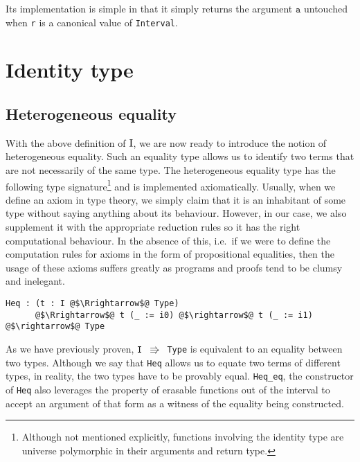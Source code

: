 \documentclass[12pt,twoside,maitrise]{dms}
\theoremstyle{definition}
\numberwithin{equation}{section}
\numberwithin{table}{chapter}
\numberwithin{figure}{chapter}
\newcommand\id[1] {\texttt{#1}}
\newcommand\fn[1] {\texttt{#1}}
\begin{document}
Its implementation is simple in that it simply returns the argument $\id{a}$
untouched when \id{r} is a canonical value of \id{Interval}.

\section{Identity type}\label{sec:identity}


\subsection{Heterogeneous equality}
With the above definition of $\mathrm{I}$, we are now ready to introduce the notion of
heterogeneous equality. Such an equality type allows us to identify two terms
that are not necessarily of the same type. The heterogeneous equality type has
the following type signature\footnote{Although not mentioned explicitly,
functions involving the identity type are universe polymorphic in their
arguments and return type.} and is implemented axiomatically. Usually, when we
define an axiom in type theory, we simply claim that it is an inhabitant of some
type without saying anything about its behaviour. However, in our case, we also
supplement it with the appropriate reduction rules so it has the right
computational behaviour. In the absence of this, i.e.\ if we were to define the
computation rules for axioms in the form of propositional equalities, then the
usage of these axioms suffers greatly as programs and proofs tend to be clumsy
and inelegant.

\begin{verbatim}
Heq : (t : I @$\Rrightarrow$@ Type)
      @$\Rrightarrow$@ t (_ := i0) @$\rightarrow$@ t (_ := i1) @$\rightarrow$@ Type
\end{verbatim}

As we have previously proven, \fn{I $\Rrightarrow$ Type} is equivalent to an
equality between two types. Although we say that \fn{Heq} allows us to equate
two terms of different types, in reality, the two types have to be provably
equal. \id{Heq\_eq}, the constructor of \id{Heq} also leverages the property of
erasable functions out of the interval to accept an argument of that form as a
witness of the equality being constructed.
\end{document}
